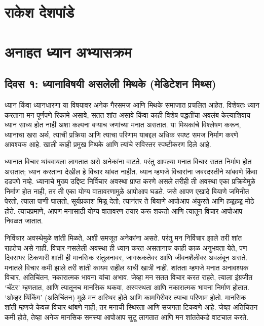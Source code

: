 \chapter*{राकेश देशपांडे}

\chapter{अनाहत  ध्यान अभ्यासक्रम}
\section*{दिवस १: ध्यानाविषयी असलेली मिथके (मेडिटेशन मिथ्स)}
ध्यान किंवा ध्यानधारणा या विषयावर अनेक गैरसमज आणि मिथके समाजात प्रचलित आहेत. विशेषतः ध्यान करताना मन पूर्णपणे रिकामे असावे, सतत शांत असावे किंवा काही विशेष पद्धतींचा अवलंब केल्याशिवाय ध्यान साध्य होत नाही अशा कल्पना बऱ्याच जणांच्या मनात असतात. या मिथकांचे विश्लेषण करून, ध्यानाचा खरा अर्थ, त्याची प्रक्रिया आणि त्याचा परिणाम याबद्दल अधिक स्पष्ट समज निर्माण करणे आवश्यक आहे. खाली काही प्रमुख मिथके आणि त्यांचे सविस्तर स्पष्टीकरण दिले आहे.

ध्यानात विचार थांबवायला लागतात असे अनेकांना वाटते. परंतु आपल्या मनात विचार सतत निर्माण होत असतात; ध्यान करताना देखील हे विचार थांबत नाहीत. ध्यान म्हणजे विचारांना जबरदस्तीने थांबवणे किंवा दडपणे नव्हे. ध्यानाचे मुख्य उद्दिष्ट निर्विचार अवस्था प्राप्त करणे असले तरीही ती अवस्था एका प्रक्रियेमुळे निर्माण होत नाही, तर ती एका योग्य वातावरणामुळे आपोआप घडते. जसे आपण एखादे बियाणे जमिनीत पेरतो, त्याला पाणी घालतो, सूर्यप्रकाश मिळू देतो; त्यानंतर ते बियाणे आपोआप अंकुरते आणि हळूहळू मोठे होते. त्याचप्रमाणे, आपण मनासाठी योग्य वातावरण तयार करू शकतो आणि त्यातून विचार आपोआप निवळत जातात.

निर्विचार अवस्थेमुळे शांती मिळते, अशी समजूत अनेकांना असते. परंतु मन निर्विचार झाले तरी शांत राहतेच असे नाही. विचार नसलेली अवस्था ही ध्यान करत असतानाच काही काळ अनुभवता येते, पण दिवसभर टिकणारी शांती ही मानसिक संतुलनावर, जागरूकतेवर आणि जीवनशैलीवर अवलंबून असते. मनातले विचार कमी झाले तरी शांती कायम राहील याची खात्री नाही. शांतता म्हणजे मनात अनावश्यक विचार, अतिचिंतन, नकारात्मक भावना यांचा अभाव. जेव्हा मन सतत विचार करत राहते, त्याला इंग्रजीत ‘चॅटर’ म्हणतात, आणि त्यातूनच मानसिक थकवा, अस्वस्थता आणि नकारात्मक भावना निर्माण होतात. ‘ओव्हर थिंकिंग’ (अतिचिंतन) मुळे मन अस्थिर होते आणि कामगिरीवर त्याचा परिणाम होतो. मानसिक शांती म्हणजे केवळ विचार थांबणे नाही; तर मनाची स्थिरता आणि सजगता टिकवणे आहे. जेव्हा अतिचिंतन कमी होते, तेव्हा अनेक मानसिक समस्या आपोआप सुटू लागतात आणि मन शांततेकडे वाटचाल करते.

